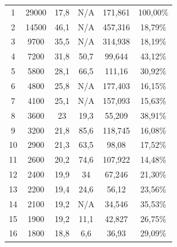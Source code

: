 \begin{longtable}[H]{cccccc}
  1           & 29000                & 17,8          & N/A            & 171,861       & 100,00\%                             \\
  2           & 14500                & 46,1          & N/A            & 457,316       & 18,79\%                              \\
  3           & 9700                 & 35,5          & N/A            & 314,938       & 18,19\%                              \\
  4           & 7200                 & 31,8          & 50,7           & 99,644        & 43,12\%                              \\
  5           & 5800                 & 28,1          & 66,5           & 111,16        & 30,92\%                              \\
  6           & 4800                 & 25,8          & N/A            & 177,403       & 16,15\%                              \\
  7           & 4100                 & 25,1          & N/A            & 157,093       & 15,63\%                              \\
  8           & 3600                 & 23            & 19,3           & 55,209        & 38,91\%                              \\
  9           & 3200                 & 21,8          & 85,6           & 118,745       & 16,08\%                              \\
  10          & 2900                 & 21,3          & 63,5           & 98,08         & 17,52\%                              \\
  11          & 2600                 & 20,2          & 74,6           & 107,922       & 14,48\%                              \\
  12          & 2400                 & 19,9          & 34             & 67,246        & 21,30\%                              \\
  13          & 2200                 & 19,4          & 24,6           & 56,12         & 23,56\%                              \\
  14          & 2100                 & 19,2          & N/A            & 34,546        & 35,53\%                              \\
  15          & 1900                 & 19,2          & 11,1           & 42,827        & 26,75\%                              \\
  16          & 1800                 & 18,8          & 6,6            & 36,93         & 29,09\%                              \\

\end{longtable}
